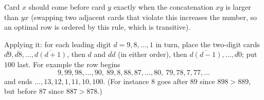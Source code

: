 Card $x$ should come before card $y$ exactly when the concatenation $xy$ is larger than $yx$ (swapping two adjacent cards that violate this increases the number, so an optimal row is ordered by this rule, which is transitive).

Applying it: for each leading digit $d=9,8,\dots,1$ in turn, place the two-digit cards $\overline{d9},\overline{d8},\dots,\overline{d(d+1)}$, then $d$ and $\overline{dd}$ (in either order), then $\overline{d(d-1)},\dots,\overline{d0}$; put $100$ last. For example the row begins
\[9,99,98,\dots,90,\ 89,8,88,87,\dots,80,\ 79,78,7,77,\dots\]
and ends $\dots,13,12,1,11,10,100$. (For instance $8$ goes after $89$ since $898>889$, but before $87$ since $887>878$.)
